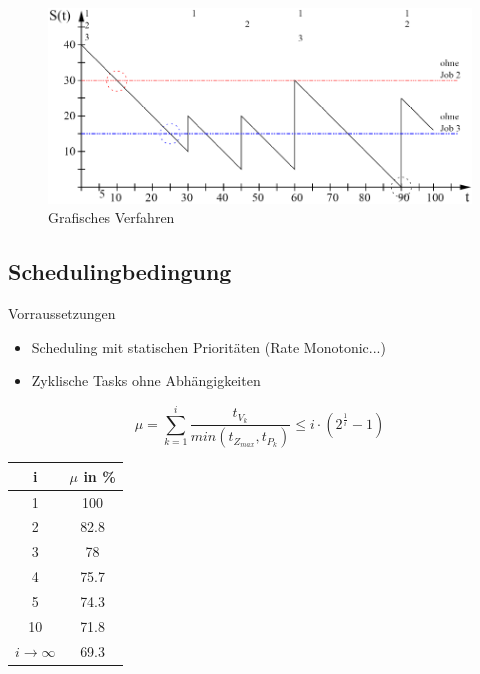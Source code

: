 \begin{figure}[h!]
	\begin{center}
		\includegraphics[width=\linewidth]{pics/reaktionszeit}
		\caption{Grafisches Verfahren}
	\end{center}
\end{figure}

\subsection{Schedulingbedingung}
Vorraussetzungen
\begin{itemize}
	\item Scheduling mit statischen Prioritäten (Rate Monotonic...)
	\item Zyklische Tasks ohne Abhängigkeiten
\end{itemize}

\begin{equation*}
	\mu = \sum_{k=1}^{i} \frac{t_{V_k}}{min(t_{Z_{max}}, t_{P_k})} \leq i\cdot (2^{\frac{1}{i}}-1)
\end{equation*}

\begin{tabular}{| c | c |}
	\hline
	i & $\mu$ in \% \\ \hline
	1 & 100 \\
	2 & 82.8 \\
	3 & 78 \\
	4 & 75.7 \\
	5 & 74.3 \\
	10 & 71.8 \\
	$i \rightarrow \infty$ & 69.3 \\ \hline
\end{tabular}